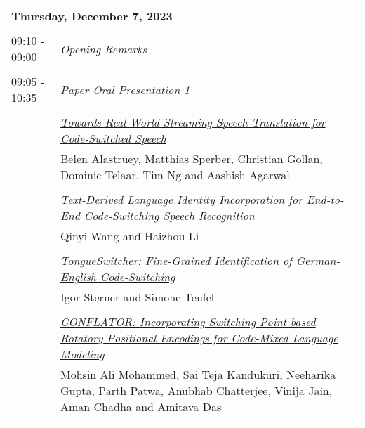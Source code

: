 \documentclass[11pt,oneside]{book}
\begin{document}
        \begin{tabular}{p{24mm}p{124mm}}
    \multicolumn{2}{l}{\bf Thursday, December 7, 2023 } \\\\
                09:10 - 09:00 & \emph{Opening Remarks}\\\\
      
                      09:05 - 10:35 & \emph{Paper Oral Presentation 1}\\\\
      
                
                      & \hyperlink{page.14}{\emph{Towards Real-World Streaming Speech Translation for Code-Switched Speech}}\\
        & Belen Alastruey\index{Alastruey}, Matthias Sperber\index{Sperber}, Christian Gollan\index{Gollan}, Dominic Telaar\index{Telaar}, Tim Ng\index{Ng} and Aashish Agarwal\index{Agarwal}\\\\
                
                      & \hyperlink{page.33}{\emph{Text-Derived Language Identity Incorporation for End-to-End Code-Switching Speech Recognition}}\\
        & Qinyi Wang\index{Wang} and Haizhou Li\index{Li}\\\\
                
                      & \hyperlink{page.1}{\emph{TongueSwitcher: Fine-Grained Identification of German-English Code-Switching}}\\
        & Igor Sterner\index{Sterner} and Simone Teufel\index{Teufel}\\\\
                
                      & \hyperlink{page.64}{\emph{CONFLATOR: Incorporating Switching Point based Rotatory Positional Encodings for Code-Mixed Language Modeling}}\\
        & Mohsin Ali Mohammed\index{Mohammed}, Sai Teja Kandukuri\index{Kandukuri}, Neeharika Gupta\index{Gupta}, Parth Patwa\index{Patwa}, Anubhab Chatterjee\index{Chatterjee}, Vinija Jain\index{Jain}, Aman Chadha\index{Chadha} and Amitava Das\index{Das}\\\\
                

\end{tabular}
\end{document}
